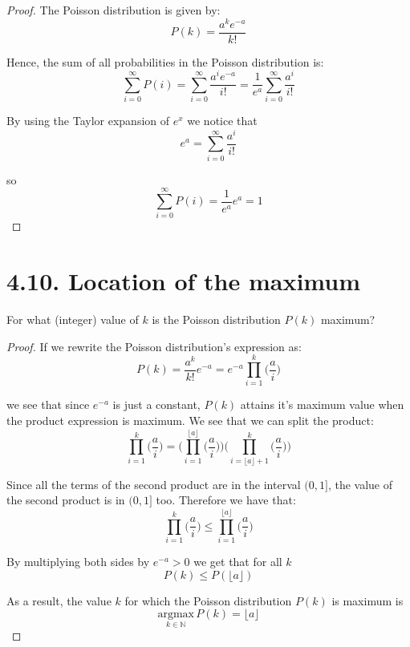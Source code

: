 \vspace{1em}

\begin{proof}
    The Poisson distribution is given by:
    \begin{equation*}\tag{4.40}
        P(k) = \frac{a^ke^{-a}}{k!}
    \end{equation*}

    Hence, the sum of all probabilities in the Poisson distribution is: 
    \[
        \sum_{i = 0}^\infty P(i) = \sum_{i = 0}^\infty   \frac{a^ie^{-a}}{i!} 
        = \frac{1}{e^a} \sum_{i = 0}^\infty \frac{a^i}{i!}
    \] 

    By using the Taylor expansion of $e^x$ we notice that
    \begin{equation*}\tag{7.7}
        e^a = \sum_{i = 0}^\infty \frac{a^i}{i!}
    \end{equation*}

    so 
    \[
        \sum_{i = 0}^\infty P(i) = \frac{1}{e^a} e^a = 1
    \] 
\end{proof}

\section*{4.10. Location of the maximum}
For what (integer) value of $k$ is the Poisson distribution $P(k)$ maximum?

\vspace{1em}

\begin{proof}
    If we rewrite the Poisson distribution's expression as:
    \[
        P(k) = \frac{a^k}{k!} e^{-a} = e^{-a} \prod_{i = 1}^k \bigg(\frac{a}{i}\bigg)
    \] 

    we see that since $e^{-a}$ is just a constant, $P(k)$ attains it's maximum 
    value when the product expression is maximum. We see that we can split 
    the product: 
    \[
        \prod_{i = 1}^{k} \bigg(\frac{a}{i}\bigg) = 
        \bigg(\prod_{i = 1}^{\lfloor a \rfloor} \bigg(\frac{a}{i}\bigg)\bigg)
        \bigg(\prod_{i = \lfloor a \rfloor + 1}^{k}\bigg(\frac{a}{i}\bigg)\bigg)
    \] 

    Since all the terms of the second product are in the interval $(0, 1]$, the value of the
    second product is in $(0, 1]$ too. Therefore we have that:
    \[
        \prod_{i = 1}^{k} \bigg(\frac{a}{i}\bigg) \leq
        \prod_{i = 1}^{\lfloor a \rfloor} \bigg(\frac{a}{i}\bigg)
    \] 

    By multiplying both sides by $e^{-a} > 0$ we get that for all $k$
     \[
         P(k) \leq P(\lfloor a \rfloor)
    \] 
    
    As a result, the value $k$ for which the Poisson distribution $P(k)$ is maximum is
    \[
        \underset{k \in \mathbb{N}}{\mathrm{argmax}}\, P(k) = \lfloor a \rfloor
    \] 
\end{proof}

